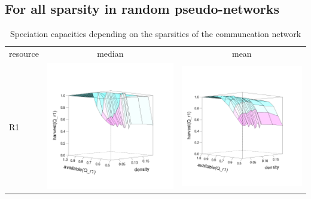 \documentclass[a4paper,10pt]{article}
\begin{document}
\subsection{For all sparsity in random pseudo-networks}


\begin{table}[H]
\caption{Speciation capacities depending on the sparsities of the communcation network}
\centering
\begin{tabular}{lcc}
resource & median & mean\\
R1 & \includegraphics[width=\imgSize]{images/R1_median}&\includegraphics[width=\imgSize]{images/R1_mean}\\

\end{tabular}
\end{table}
\end{document}
